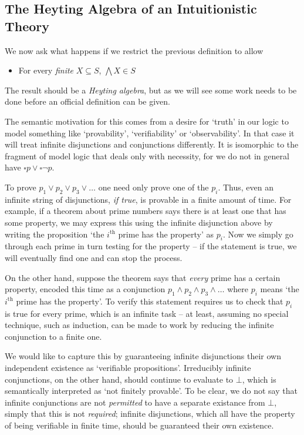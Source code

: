 \documentclass[oneside,english]{article}
\theoremstyle{plain}
\theoremstyle{definition}
\theoremstyle{definition}
\begin{document}
\subsection{The Heyting Algebra of an Intuitionistic Theory}

We now ask what happens if we restrict the previous definition to allow
\begin{itemize}
	\item For every \emph{finite} $X\subseteq S$, $\bigwedge X\in S$
\end{itemize}
The result should be a \emph{Heyting algebra}, but as we will see some work needs to be done before an official definition can be given.

The semantic motivation for this comes from a desire for `truth' in our logic to model something like `provability', `verifiability' or `observability'. In that case it will treat infinite disjunctions and conjunctions differently. It is isomorphic to the fragment of model logic that deals only with necessity, for we do not in general have $\square p\lor\square\lnot p$.

To prove $p_1\lor p_2\lor p_3\lor \dots$ one need only prove one of the $p_i$. Thus, even an infinite string of disjunctions, \emph{if true}, is provable in a finite amount of time. For example, if a theorem about prime numbers says there is at least one that has some property, we may express this using the infinite disjunction above by writing the proposition `the $i^{\text{th}}$ prime has the property' as $p_i$. Now we simply go through each prime in turn testing for the property -- if the statement is true, we will eventually find one and can stop the process.

On the other hand, suppose the theorem says that \emph{every} prime has a certain property, encoded this time as a conjunction $p_1\land p_2\land p_3\land \dots$ where $p_i$ means `the $i^{\text{th}}$ prime has the property'. To verify this statement requires us to check that $p_i$ is true for every prime, which is an infinite task -- at least, assuming no special technique, such as induction, can be made to work by reducing the infinite conjunction to a finite one. 

We would like to capture this by guaranteeing infinite disjunctions their own independent existence as `verifiable propositions'. Irreducibly infinite conjunctions, on the other hand, should continue to evaluate to $\bot$, which is semantically interpreted as `not finitely provable'. To be clear, we do not say that infinite conjunctions are not \emph{permitted} to have a separate existance from $\bot$, simply that this is not \emph{required}; infinite disjunctions, which all have the property of being verifiable in finite time, should be guaranteed their own existence.
\end{document}
